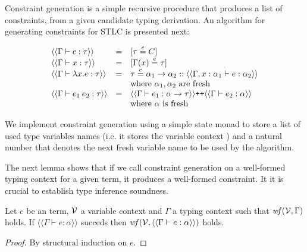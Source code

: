 Constraint generation is a simple recursive procedure that produces a
list of constraints, from a given candidate typing derivation. An
algorithm for generating constraints for STLC is presented next:

\[
\begin{array}{lcl}
  \langle\langle \Gamma \vdash c : \tau \rangle\rangle & = & \lbrack\tau \overset{e}{=} C \rbrack\\
  \langle\langle \Gamma \vdash x :\tau\rangle\rangle & = & \lbrack\Gamma(x) \overset{e}{=} \tau\rbrack\\
  \langle\langle \Gamma \vdash \lambda x . e : \tau \rangle\rangle & = &
        \tau \overset{e}{=} \alpha_1 \to \alpha_2  ::
        \langle\langle \Gamma, x : \alpha_1 \vdash e : \alpha_2 \rangle\rangle
        \\
        & & \text{where }\alpha_1,\alpha_2 \text{ are fresh}\\
   \langle\langle \Gamma \vdash e_1\:e_2 : \tau \rangle\rangle & = &
      \langle\langle \Gamma\vdash e_1 : \alpha \to \tau \rangle\rangle \texttt{++}
      \langle\langle \Gamma\vdash e_2 : \alpha \rangle\rangle \\
      & & \text{where }\alpha \text{ is fresh}\\
\end{array}
\]

We implement constraint generation using a simple state monad to store
a list of used type variables names (i.e. it stores the variable
context \V) and a natural number that denotes the next fresh variable
name to be used by the algorithm.

The next lemma shows that if we call constraint generation on a
well-formed typing context for a given term, it produces a well-formed
constraint. It it is crucial to establish type inference soundness.

\begin{Lemma}
   Let $e$ be an term, $\mathcal{V}$ a variable context and $\Gamma$ a typing
   context such that $\text{\it wf\/}(\mathcal{V},\Gamma)$ holds. If $\langle\langle \Gamma
   \vdash e : \alpha \rangle\rangle$ succeds then $\text{\it wf\/}(\mathcal{V},
   \langle\langle \Gamma \vdash e : \alpha \rangle\rangle)$ holds.
\end{Lemma}\label{lem:genctr}
\begin{proof}
   By structural induction on $e$.
\end{proof}
